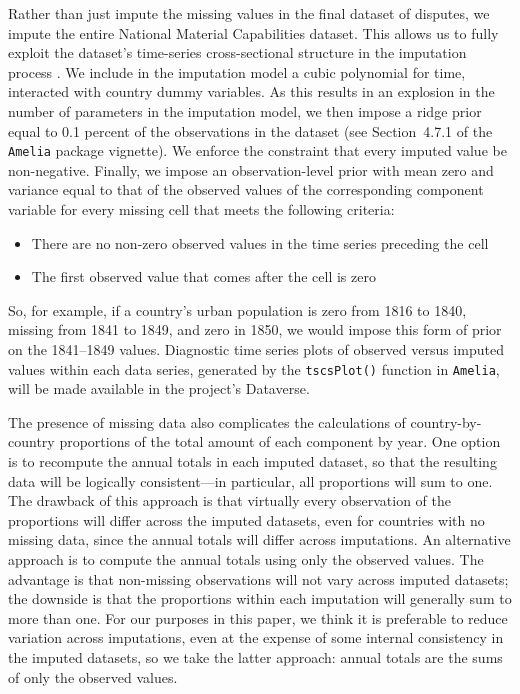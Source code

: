 Rather than just impute the missing values in the final dataset of disputes, we impute the entire National Material Capabilities dataset.
This allows us to fully exploit the dataset's time-series cross-sectional structure in the imputation process .
We include in the imputation model a cubic polynomial for time, interacted with country dummy variables.
As this results in an explosion in the number of parameters in the imputation model, we then impose a ridge prior equal to 0.1 percent of the observations in the dataset (see Section~4.7.1 of the \texttt{Amelia} package vignette).
We enforce the constraint that every imputed value be non-negative.
Finally, we impose an observation-level prior with mean zero and variance equal to that of the observed values of the corresponding component variable for every missing cell that meets the following criteria:
\begin{itemize}
  \item There are no non-zero observed values in the time series preceding the cell
  \item The first observed value that comes after the cell is zero
\end{itemize}
So, for example, if a country's urban population is zero from 1816 to 1840, missing from 1841 to 1849, and zero in 1850, we would impose this form of prior on the 1841--1849 values.
Diagnostic time series plots of observed versus imputed values within each data series, generated by the \texttt{tscsPlot()} function in \texttt{Amelia}, will be made available in the project's Dataverse.

The presence of missing data also complicates the calculations of country-by-country proportions of the total amount of each component by year.
One option is to recompute the annual totals in each imputed dataset, so that the resulting data will be logically consistent---in particular, all proportions will sum to one.
The drawback of this approach is that virtually every observation of the proportions will differ across the imputed datasets, even for countries with no missing data, since the annual totals will differ across imputations.
An alternative approach is to compute the annual totals using only the observed values.
The advantage is that non-missing observations will not vary across imputed datasets; the downside is that the proportions within each imputation will generally sum to more than one.
For our purposes in this paper, we think it is preferable to reduce variation across imputations, even at the expense of some internal consistency in the imputed datasets, so we take the latter approach: annual totals are the sums of only the observed values.

